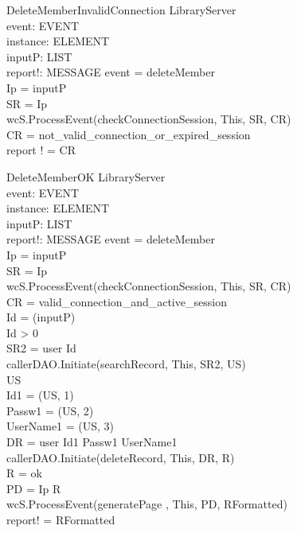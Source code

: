 \begin{schema}{DeleteMemberInvalidConnection}
\Xi LibraryServer \\
event: EVENT \\
instance: ELEMENT \\
inputP: LIST \\
report!: MESSAGE
\where event = deleteMember \\
Ip = \head inputP \\
SR = \lseq Ip \rseq \\ 
wcS.ProcessEvent(checkConnectionSession, This, SR, CR) \\
CR = not\_valid\_connection\_or\_expired\_session \\ 
report ! = CR
\end{schema}


\begin{schema}{DeleteMemberOK}
\Delta LibraryServer \\
event: EVENT \\
instance: ELEMENT \\
inputP: LIST \\
report!: MESSAGE
\where event = deleteMember \\
Ip = \head inputP \\
SR = \lseq Ip \rseq \\ 
wcS.ProcessEvent(checkConnectionSession, This, SR, CR) \\
CR = valid\_connection\_and\_active\_session \\
Id = \head (\tail inputP) \\
Id > 0 \\
SR2 = \lseq user Id \rseq \\
callerDAO.Initiate(searchRecord, This, SR2, US) \\
US \neq \emptyset \\
Id1 = \nth(\head US, 1) \\
Passw1 = \nth(\head US, 2) \\
UserName1 = \nth(\head US, 3) \\ 
DR = \lseq user Id1 Passw1 UserName1 \rseq \\
callerDAO.Initiate(deleteRecord, This, DR, R) \\
R = ok \\
PD = \lseq Ip R \rseq \\
wcS.ProcessEvent(generatePage , This, PD, RFormatted) \\
report! = RFormatted 
\end{schema}

